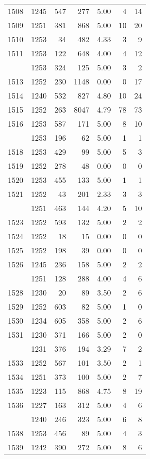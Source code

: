 \documentclass[
]{article}
\begin{document}
\begin{table}
\begin{tabular}[t]{lrrrrrr}
1508 & 1245 & 547 & 277 & 5.00 & 4 & 14\\
1509 & 1251 & 381 & 868 & 5.00 & 10 & 20\\
1510 & 1253 & 34 & 482 & 4.33 & 3 & 9\\
1511 & 1253 & 122 & 648 & 4.00 & 4 & 12\\
\addlinespace
1512 & 1253 & 324 & 125 & 5.00 & 3 & 2\\
1513 & 1252 & 230 & 1148 & 0.00 & 0 & 17\\
1514 & 1240 & 532 & 827 & 4.80 & 10 & 24\\
1515 & 1252 & 263 & 8047 & 4.79 & 78 & 73\\
1516 & 1253 & 587 & 171 & 5.00 & 8 & 10\\
\addlinespace
1517 & 1253 & 196 & 62 & 5.00 & 1 & 1\\
1518 & 1253 & 429 & 99 & 5.00 & 5 & 3\\
1519 & 1252 & 278 & 48 & 0.00 & 0 & 0\\
1520 & 1253 & 455 & 133 & 5.00 & 1 & 1\\
1521 & 1252 & 43 & 201 & 2.33 & 3 & 3\\
\addlinespace
1522 & 1251 & 463 & 144 & 4.20 & 5 & 10\\
1523 & 1252 & 593 & 132 & 5.00 & 2 & 2\\
1524 & 1252 & 18 & 15 & 0.00 & 0 & 0\\
1525 & 1252 & 198 & 39 & 0.00 & 0 & 0\\
1526 & 1245 & 236 & 158 & 5.00 & 2 & 2\\
\addlinespace
1527 & 1251 & 128 & 288 & 4.00 & 4 & 6\\
1528 & 1230 & 20 & 89 & 3.50 & 2 & 6\\
1529 & 1252 & 603 & 82 & 5.00 & 1 & 0\\
1530 & 1234 & 605 & 358 & 5.00 & 2 & 6\\
1531 & 1230 & 371 & 166 & 5.00 & 2 & 0\\
\addlinespace
1532 & 1231 & 376 & 194 & 3.29 & 7 & 2\\
1533 & 1252 & 567 & 101 & 3.50 & 2 & 1\\
1534 & 1251 & 373 & 100 & 5.00 & 2 & 7\\
1535 & 1223 & 115 & 868 & 4.75 & 8 & 19\\
1536 & 1227 & 163 & 312 & 5.00 & 4 & 6\\
\addlinespace
1537 & 1240 & 246 & 323 & 5.00 & 6 & 8\\
1538 & 1253 & 456 & 89 & 5.00 & 4 & 3\\
1539 & 1242 & 390 & 272 & 5.00 & 8 & 6\\

\end{tabular}
\end{table}
\end{document}
